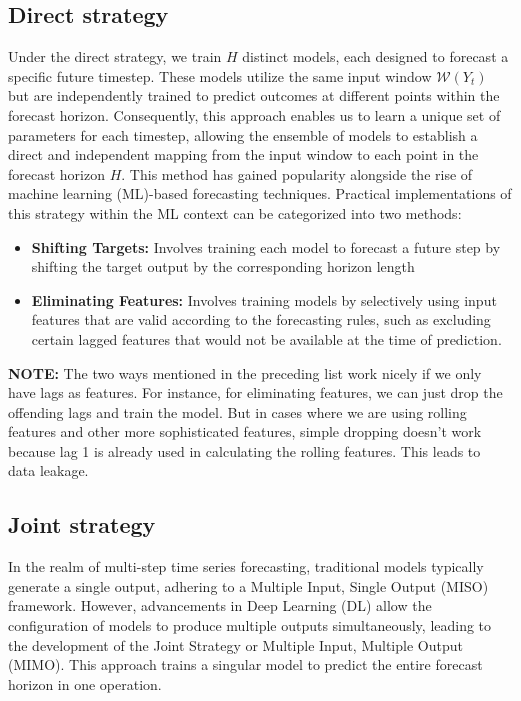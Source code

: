 \documentclass{article}
\begin{document}
\subsection{Direct strategy}
Under the direct strategy, we train $H$ distinct models, each designed to forecast a specific future timestep. 
These models utilize the same input window $\mathcal{W}(Y_t)$ but are independently trained to predict outcomes 
at different points within the forecast horizon. Consequently, this approach enables us to learn a unique set of 
parameters for each timestep, allowing the ensemble of models to establish a direct and independent mapping from the 
input window to each point in the forecast horizon $H$. This method has gained popularity alongside the rise of 
machine learning (ML)-based forecasting techniques. Practical implementations of this strategy within the ML context can be 
categorized into two methods: 

\begin{itemize}
    \item \textbf{Shifting Targets:} Involves training each model to forecast a future step by shifting the target output by the corresponding horizon length
    \item \textbf{Eliminating Features:} Involves training models by selectively using input features that are valid according to the forecasting rules, such as excluding certain lagged features that would not be available at the time of prediction.
\end{itemize}

\textbf{NOTE:} The two ways mentioned in the preceding list work nicely if we only have lags as features. For
instance, for eliminating features, we can just drop the offending lags and train the model.
But in cases where we are using rolling features and other more sophisticated features, simple
dropping doesn’t work because lag 1 is already used in calculating the rolling features. This
leads to data leakage.

\subsection{Joint strategy}
In the realm of multi-step time series forecasting, traditional models typically generate a single output, adhering to a Multiple Input, Single Output (MISO) framework. However, advancements in Deep Learning (DL) allow the configuration of models to produce multiple outputs simultaneously, leading to the development of the Joint Strategy or Multiple Input, Multiple Output (MIMO). This approach trains a singular model to predict the entire forecast horizon in one operation. 
\end{document}

